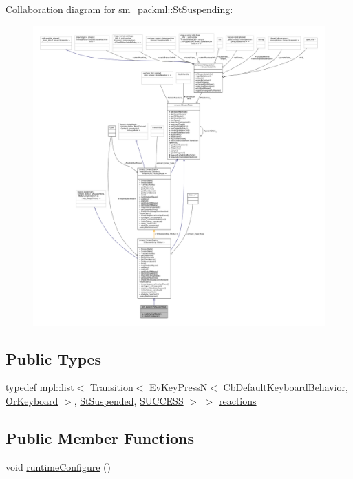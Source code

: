 Collaboration diagram for sm\+\_\+packml\+:\+:St\+Suspending\+:
\nopagebreak
\begin{figure}[H]
\begin{center}
\leavevmode
\includegraphics[width=350pt]{structsm__packml_1_1StSuspending__coll__graph}
\end{center}
\end{figure}
\subsection*{Public Types}
\begin{DoxyCompactItemize}
\item 
typedef mpl\+::list$<$ Transition$<$ Ev\+Key\+PressN$<$ Cb\+Default\+Keyboard\+Behavior, \hyperlink{classsm__packml_1_1OrKeyboard}{Or\+Keyboard} $>$, \hyperlink{structsm__packml_1_1StSuspended}{St\+Suspended}, \hyperlink{classSUCCESS}{S\+U\+C\+C\+E\+SS} $>$ $>$ \hyperlink{structsm__packml_1_1StSuspending_a0230b8d6ae21587b7537ca0e82d403d3}{reactions}
\end{DoxyCompactItemize}
\subsection*{Public Member Functions}
\begin{DoxyCompactItemize}
\item 
void \hyperlink{structsm__packml_1_1StSuspending_a8ba18b18a29151db1297ddfcbd7f9ae7}{runtime\+Configure} ()
\end{DoxyCompactItemize}
